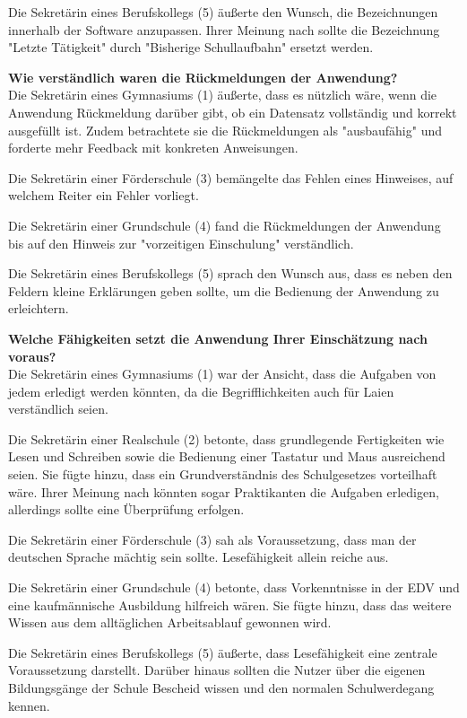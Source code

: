 Die Sekretärin eines Berufskollegs (5) äußerte den Wunsch, die Bezeichnungen innerhalb der Software anzupassen. Ihrer Meinung nach sollte die Bezeichnung "Letzte Tätigkeit" durch "Bisherige Schullaufbahn" ersetzt werden.

\textbf{Wie verständlich waren die Rückmeldungen der Anwendung?}\\
Die Sekretärin eines Gymnasiums (1) äußerte, dass es nützlich wäre, wenn die Anwendung Rückmeldung darüber gibt, ob ein Datensatz vollständig und korrekt ausgefüllt ist. Zudem betrachtete sie die Rückmeldungen als "ausbaufähig" und forderte mehr Feedback mit konkreten Anweisungen.

Die Sekretärin einer Förderschule (3) bemängelte das Fehlen eines Hinweises, auf welchem Reiter ein Fehler vorliegt.

Die Sekretärin einer Grundschule (4) fand die Rückmeldungen der Anwendung bis auf den Hinweis zur "vorzeitigen Einschulung" verständlich.

Die Sekretärin eines Berufskollegs (5) sprach den Wunsch aus, dass es neben den Feldern kleine Erklärungen geben sollte, um die Bedienung der Anwendung zu erleichtern.

\textbf{Welche Fähigkeiten setzt die Anwendung Ihrer Einschätzung nach voraus?}\\
Die Sekretärin eines Gymnasiums (1) war der Ansicht, dass die Aufgaben von jedem erledigt werden könnten, da die Begrifflichkeiten auch für Laien verständlich seien.

Die Sekretärin einer Realschule (2) betonte, dass grundlegende Fertigkeiten wie Lesen und Schreiben sowie die Bedienung einer Tastatur und Maus ausreichend seien. Sie fügte hinzu, dass ein Grundverständnis des Schulgesetzes vorteilhaft wäre. Ihrer Meinung nach könnten sogar Praktikanten die Aufgaben erledigen, allerdings sollte eine Überprüfung erfolgen.

Die Sekretärin einer Förderschule (3) sah als Voraussetzung, dass man der deutschen Sprache mächtig sein sollte. Lesefähigkeit allein reiche aus.

Die Sekretärin einer Grundschule (4) betonte, dass Vorkenntnisse in der EDV und eine kaufmännische Ausbildung hilfreich wären. Sie fügte hinzu, dass das weitere Wissen aus dem alltäglichen Arbeitsablauf gewonnen wird.

Die Sekretärin eines Berufskollegs (5) äußerte, dass Lesefähigkeit eine zentrale Voraussetzung darstellt. Darüber hinaus sollten die Nutzer über die eigenen Bildungsgänge der Schule Bescheid wissen und den normalen Schulwerdegang kennen.

